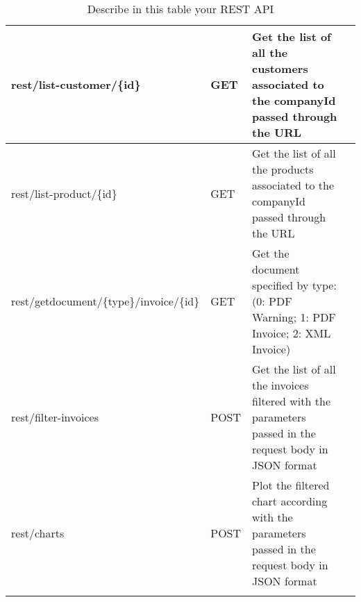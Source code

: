 \begin{longtable}{|p{}|p{} |p{}|p{}|}
rest/list-customer/\{id\} & GET & Get the list of all the customers associated to the companyId passed through the URL \\\hline
rest/list-product/\{id\} & GET & Get the list of all the products associated to the companyId passed through the URL \\\hline
rest/getdocument/\{type\}/invoice/\{id\} & GET & Get the document specified by type: (0: PDF Warning; 1: PDF Invoice; 2: XML Invoice) \\\hline
rest/filter-invoices & POST & Get the list of all the invoices filtered with the parameters passed in the request body in JSON format \\\hline
rest/charts & POST & Plot the filtered chart according with the parameters passed in the request body in JSON format \\\hline
\caption{Describe in this table your REST API}
\label{tab:termGlossary}
\end{longtable}